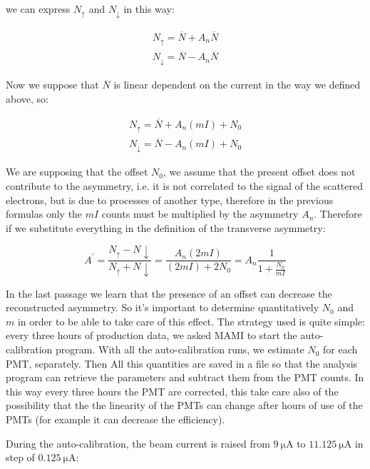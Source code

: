 we can express $N_{\uparrow}$ and $N_{\downarrow}$ in this way:

\begin{align*}
N_{\uparrow} = \overline{N} + A_{n}\overline{N} \\
N_{\downarrow} = \overline{N} - A_{n}\overline{N} 
\end{align*}

Now we suppose that $\overline{N}$ is linear dependent on the current in the way we defined above, so:

\begin{align*}
N_{\uparrow} = \overline{N} + A_{n}(mI) + N_{0} \\
N_{\downarrow} = \overline{N} - A_{n}(mI) + N_{0} 
\end{align*}

We are supposing that the offset $N_{0}$, we assume that the present offset does not contribute to the asymmetry, i.e. it is not correlated to the signal of the scattered electrons, but is due to processes of another type, therefore in the previous formulas only the $mI$ counts must be multiplied by the asymmetry $A_{n}$. Therefore if we substitute everything in the definition of the transverse asymmetry:

\begin{equation} \label{eq:Systematic}
A^{'} = \dfrac{N_{\uparrow} - N{\downarrow}}{N_{\uparrow} + N{\downarrow}} = \dfrac{A_{n} (2mI)}{ (2mI) + 2N_{0} } = A_{n} \dfrac{1}{1 + \frac{N_{0}}{mI}}
\end{equation} 

In the last passage we learn that the presence of an offset can decrease the reconstructed asymmetry. So it's important to determine quantitatively $N_{0}$ and $m$ in order to be able to take care of this effect. The strategy used is quite simple: every three hours of production data, we asked MAMI to start the auto-calibration program. With all the auto-calibration runs, we estimate $N_{0}$ for each PMT, separately. Then All this quantities are saved in a file so that the analysis program can retrieve the parameters and subtract them from the PMT counts. \medskip
In this way every three hours the PMT are corrected, this take care also of the possibility that the the linearity of the PMTs can change after hours of use of the PMTs (for example it can decrease the efficiency).

During the auto-calibration, the beam current is raised from $\SI{9}{\micro \ampere}$ to $\SI{11.125}{\micro \ampere}$ in step of $\SI{0.125}{\micro \ampere}$:

